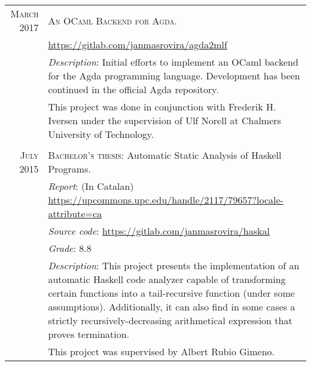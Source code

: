 \documentclass[a4paper,10pt]{article}
\begin{document}
\begin{tabular}{rp{12cm}}
  \textsc{March 2017} & \textsc{An OCaml Backend for Agda}. \\
                     &\url{https://gitlab.com/janmasrovira/agda2mlf} \\
                     &\textit{Description}: Initial efforts to implement an OCaml backend for
                       the Agda programming language. Development has been continued in
                       the official Agda repository.
                       \\&This project was done in conjunction with Frederik H. Iversen under
                       the supervision of Ulf Norell at Chalmers University of Technology. \\
  \multicolumn{2}{c}{} \\

  \textsc{July 2015} & \textsc{Bachelor's thesis}: Automatic Static Analysis of Haskell Programs. \\
  & \textit{Report}: (In Catalan) \url{https://upcommons.upc.edu/handle/2117/79657?locale-attribute=ca} \\
  & \textit{Source code}: \url{https://gitlab.com/janmasrovira/haskal} \\
  & \textit{Grade}: 8.8 \\
  & \textit{Description}: This project presents the implementation of
  an automatic Haskell code analyzer capable of transforming certain functions
  into a tail-recursive function (under some assumptions).
  Additionally, it can also find in some cases a strictly recursively-decreasing
  arithmetical expression that proves termination. \\
  & This project was supervised by Albert Rubio Gimeno.

\end{tabular}
\end{document}
